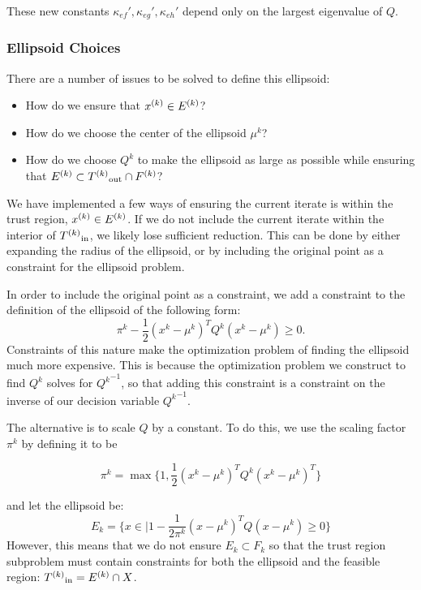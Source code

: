 These new constants $\kappa_{ef}', \kappa_{eg}', \kappa_{eh}'$ depend only on the largest eigenvalue of $Q$.

\subsubsection{Ellipsoid Choices}

There are a number of issues to be solved to define this ellipsoid:
\begin{itemize}
\item How do we ensure that ${x}^{(k)} \in {E^{(k)}} $?
\item How do we choose the center of the ellipsoid $\mu^k$?
\item How do we choose $Q^{k}$ to make the  ellipsoid as large as possible while ensuring that $ {E^{(k)}} \subset {T^{(k)}}_{\text{out}} \cap {F}^{(k)}$?
\end{itemize}

We have implemented a few ways of ensuring the current iterate is within the trust region, ${x}^{(k)} \in {E^{(k)}}$.
If we do not include the current iterate within the interior of ${T^{(k)}}_{\text{in}}$, we likely lose sufficient reduction.
This can be done by either expanding the radius of the ellipsoid, or by including the original point as a constraint for the ellipsoid problem.


In order to include the original point as a constraint, we add a constraint to the definition of the ellipsoid of the following form:
$$ \pi^k - \frac 1 2 (x^k - \mu^{k})^TQ^{k}(x^k - \mu^{k}) \ge 0. $$
Constraints of this nature make the optimization problem of finding the ellipsoid much more expensive.
This is because the optimization problem we construct to find $Q^k$ solves for ${Q^k}^{-1}$, so that adding this constraint is a constraint on the inverse of our decision variable ${Q^{k}}^{-1}$.


The alternative is to scale $Q$ by a constant.
To do this, we use the scaling factor $\pi^k$ by defining it to be

$$\pi^k = \max \{1, \frac 1 {2} (x^{k} - \mu^{k})^T Q^k (x^{k} - \mu^{k})^T \}$$

and let the ellipsoid be:
$$E_k = \{x \in \mathbb | 1 - \frac 1 {2\pi^k} (x - \mu^{k})^T Q (x - \mu^{k}) \ge 0\} $$
However, this means that we do not ensure $E_k \subset F_k$ so that the trust region subproblem must contain constraints for both the ellipsoid and the feasible region: ${T^{(k)}}_{\text{in}} = {E^{(k)}} \cap X$.

